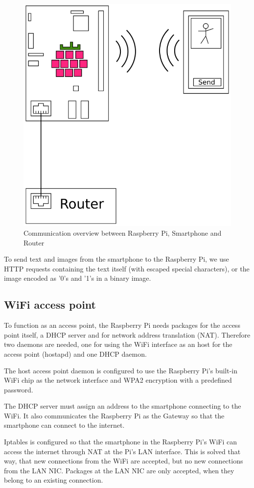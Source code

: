 \documentclass[conference]{IEEEtran}
\begin{document}
\begin{figure}[ht]
\label{FIG:COMMUNICATION}
\centering
\includegraphics[width=0.75\linewidth]{pics/RasPi-MC}
\caption{Communication overview between Raspberry Pi, Smartphone and Router}
\end{figure}

To send text and images from the smartphone to the Raspberry Pi, we use HTTP requests containing the text itself (with escaped special characters), or the image encoded as '0's and '1's in a binary image.

\subsection{WiFi access point}
To function as an access point, the Raspberry Pi needs packages for the access point itself, a DHCP server and for network address translation (NAT). Therefore two daemons are needed, one for using the WiFi interface as an host for the access point (hostapd) and one DHCP daemon.

The host access point daemon is configured to use the Raspberry Pi's built-in WiFi chip as the network interface and WPA2  encryption with a predefined password.

The DHCP server must assign an address to the smartphone connecting to the WiFi. It also communicates the Raspberry Pi as the Gateway so that the smartphone can connect to the internet.

Iptables is configured so that the smartphone in the Raspberry Pi's WiFi can access the internet through NAT at the Pi's LAN interface. This is solved that way, that new connections from the WiFi are accepted, but no new connections from the LAN NIC. Packages at the LAN NIC are only accepted, when they belong to an existing connection.
\end{document}
